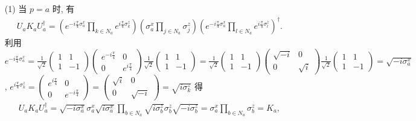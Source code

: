 \documentclass{assignment}
\begin{document}
\begin{pf}
    \begin{itemize}
        \item[(1)] 当 $p=a$ 时, 有
        \begin{align}
            U_aK_aU_a^{\dagger}=\left(e^{-i\frac{\pi}{4}\sigma_a^x}\prod_{k\in N_a}e^{i\frac{\pi}{4}\sigma_k^z}\right)\left(\sigma_a^x\prod_{j\in N_a}\sigma_j^z\right)\left(e^{-i\frac{\pi}{4}\sigma_a^x}\prod_{l\in N_a}e^{i\frac{\pi}{4}\sigma_l^z}\right)^{\dagger}.
        \end{align}
        利用 $e^{-i\frac{\pi}{4}\sigma_a^x}=\frac{1}{\sqrt{2}}\begin{pmatrix}
            1&1\\
            1&-1
        \end{pmatrix}\begin{pmatrix}
            e^{-i\frac{\pi}{4}}&0\\
            0&e^{i\frac{\pi}{4}}
        \end{pmatrix}\frac{1}{\sqrt{2}}\begin{pmatrix}
            1&1\\
            1&-1
        \end{pmatrix}=\frac{1}{\sqrt{2}}\begin{pmatrix}
            1&1\\
            1&-1
        \end{pmatrix}\begin{pmatrix}
            \sqrt{-i}&0\\
            0&\sqrt{i}
        \end{pmatrix}\frac{1}{\sqrt{2}}\begin{pmatrix}
            1&1\\
            1&-1
        \end{pmatrix}=\sqrt{-i\sigma_a^x}$, $e^{i\frac{\pi}{4}\sigma_k^z}=\begin{pmatrix}
            e^{i\frac{\pi}{4}}&0\\
            0&e^{-i\frac{\pi}{4}}
        \end{pmatrix}=\begin{pmatrix}
            \sqrt{i}&0\\
            0&\sqrt{-i}
        \end{pmatrix}=\sqrt{i\sigma_k^z}$ 得
        \begin{align}
            U_aK_aU_a^{\dagger}=\sqrt{-i\sigma_a^x}\sigma_a^x\sqrt{i\sigma_a^x}\prod_{b\in N_a}\sqrt{i\sigma_b^z}\sigma_b^z\sqrt{-i\sigma_b^z}=\sigma_a^x\prod_{b\in N_a}\sigma_b^z=K_a,
        \end{align}

\end{itemize}
\end{pf}
\end{document}
